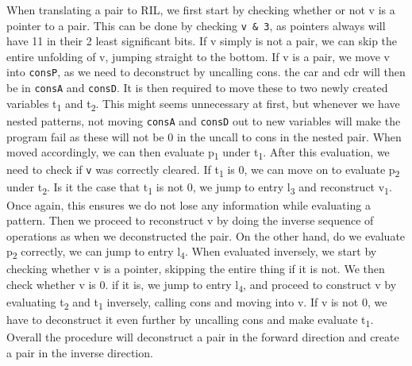 \documentclass[a4paper]{article}
\begin{document}
When translating a pair to RIL, we first start by checking whether or not v is a pointer to a pair. This can be done by checking \texttt{v \& 3}, as pointers always will have 11 in their 2 least significant bits. If v simply is not a pair, we can skip the entire unfolding of v, jumping straight to the bottom. If v is a pair, we move v into \texttt{consP}, as we need to deconstruct by uncalling cons. the car and cdr will then be in \texttt{consA} and \texttt{consD}. It is then required to move these to two newly created variables t\textsubscript{1} and t\textsubscript{2}. This might seems unnecessary at first, but whenever we have nested patterns, not moving \texttt{consA} and \texttt{consD} out to new variables will make the program fail as these will not be 0 in the uncall to cons in the nested pair. When moved accordingly, we can then evaluate p\textsubscript{1} under t\textsubscript{1}. After this evaluation, we need to check if \texttt{v} was correctly cleared. If t\textsubscript{1} is 0, we can move on to evaluate p\textsubscript{2} under t\textsubscript{2}. Is it the case that t\textsubscript{1} is not 0, we jump to entry l\textsubscript{3} and reconstruct v\textsubscript{1}. Once again, this ensures we do not lose any information while evaluating a pattern. Then we proceed to reconstruct v by doing the inverse sequence of operations as when we deconstructed the pair. On the other hand, do we evaluate p\textsubscript{2} correctly, we can jump to entry l\textsubscript{4}. When evaluated inversely, we start by checking whether v is a pointer, skipping the entire thing if it is not. We then check whether v is 0. if it is, we jump to entry l\textsubscript{4}, and proceed to construct v by evaluating t\textsubscript{2} and t\textsubscript{1} inversely, calling cons and moving into v. If v is not 0, we have to deconstruct it even further by uncalling cons and make evaluate t\textsubscript{1}. Overall the procedure will deconstruct a pair in the forward direction and create a pair in the inverse direction.
\end{document}
